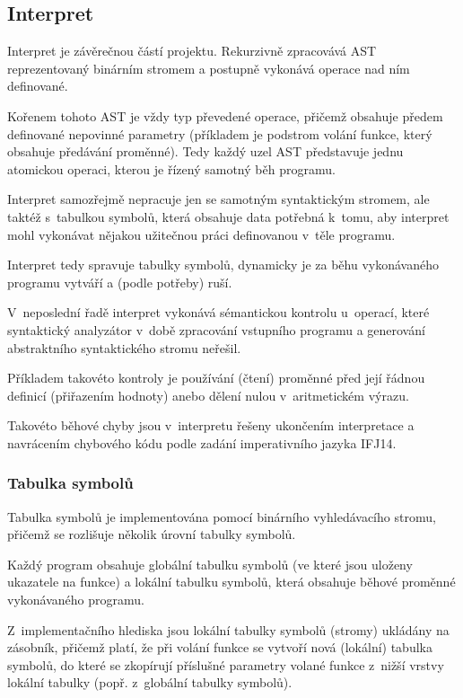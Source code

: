 \documentclass[12pt,a4paper,titlepage,final]{article}
\begin{document}
\subsection{Interpret} \label{interpret}

Interpret je závěrečnou částí projektu. Rekurzivně zpracovává AST reprezentovaný
binárním stromem a postupně vykonává operace nad ním definované.

Kořenem tohoto AST je vždy typ převedené operace, přičemž obsahuje předem
definované nepovinné parametry (příkladem je podstrom volání funkce, který
obsahuje předávání proměnné). Tedy každý uzel AST představuje jednu atomickou
operaci, kterou je řízený samotný běh programu.

Interpret samozřejmě nepracuje jen se samotným syntaktickým stromem, ale
taktéž s~tabulkou symbolů, která obsahuje data potřebná k~tomu, aby interpret
mohl vykonávat nějakou užitečnou práci definovanou v~těle programu.

Interpret tedy spravuje tabulky symbolů, dynamicky je za běhu
vykonávaného programu vytváří a (podle potřeby) ruší.

V~neposlední řadě interpret vykonává sémantickou kontrolu u~operací, které
syntaktický analyzátor v~době zpracování vstupního programu a generování
abstraktního syntaktického stromu neřešil.

Příkladem takovéto kontroly je používání (čtení) proměnné před její řádnou
definicí (přiřazením hodnoty) anebo dělení nulou v~aritmetickém výrazu.

Takovéto běhové chyby jsou v~interpretu řešeny ukončením interpretace a navrácením
chybového kódu podle zadání imperativního jazyka IFJ14.

\subsubsection{Tabulka symbolů} \label{tabulka_symbolu}

Tabulka symbolů je implementována pomocí binárního vyhledávacího stromu,
přičemž se rozlišuje několik úrovní tabulky symbolů.

Každý program obsahuje globální tabulku symbolů (ve které jsou uloženy ukazatele
na funkce) a lokální tabulku symbolů, která obsahuje běhové proměnné
vykonávaného programu.

Z~implementačního hlediska jsou lokální tabulky symbolů (stromy) ukládány na
zásobník, přičemž platí, že při volání funkce se vytvoří nová (lokální)
tabulka symbolů, do které se zkopírují příslušné parametry volané funkce
z~nižší vrstvy lokální tabulky (popř. z~globální tabulky symbolů).
\end{document}
